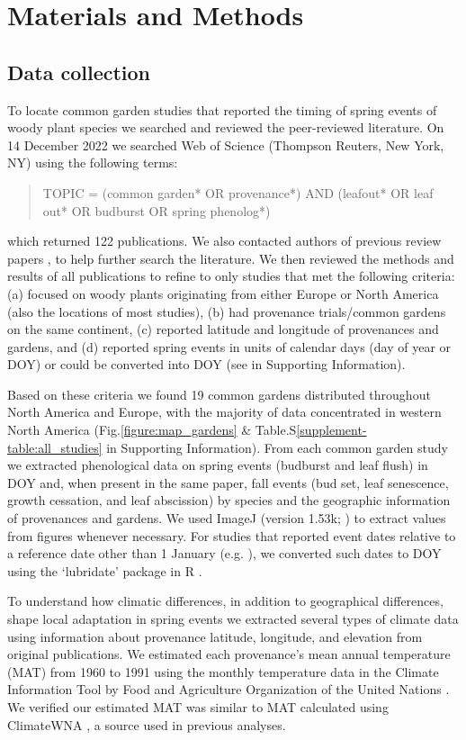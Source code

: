 \documentclass[12pt]{article}
\begin{document}
\section{Materials and Methods}
\subsection{Data collection}
To locate common garden studies that reported the timing of spring events of woody plant species we searched and reviewed the peer-reviewed literature. On 14 December 2022 we searched Web of Science (Thompson Reuters, New York, NY) using the following terms:
\begin{quote}
TOPIC = (common garden* OR provenance*) AND (leafout* OR leaf out* OR budburst OR spring phenolog*)
\end{quote}
which returned 122 publications. We also contacted authors of previous review papers \citep{AitkenBemmels16, Alberto13}, to help further search the literature. We then reviewed the methods and results of all publications to refine to only studies that met the following criteria: (a) focused on woody plants originating from either Europe or North America (also the locations of most studies), (b) had provenance trials/common gardens on the same continent, (c) reported latitude and longitude of provenances and gardens, and (d) reported spring events in units of calendar days (day of year or DOY) or could be converted into DOY (see  in Supporting Information).

Based on these criteria we found 19 common gardens distributed throughout North America and Europe, with the majority of data concentrated in western North America (Fig.\ref{figure:map_gardens} \& Table.S\ref{supplement-table:all_studies} in Supporting Information). From each common garden study we extracted phenological data on spring events (budburst and leaf flush) in DOY and, when present in the same paper, fall events (bud set, leaf senescence, growth cessation, and leaf abscission) by species and the geographic information of provenances and gardens. We used ImageJ (version 1.53k; \citealp{schneider_rasband_eliceiri_2012}) to extract values from figures whenever necessary. For studies that reported event dates relative to a reference date other than 1 January (e.g. \citealp{Rehfeldt1994}), we converted such dates to DOY using the `lubridate' package in R \citep{Grolemund11}. 

To understand how climatic differences, in addition to geographical differences, shape local adaptation in spring events we extracted several types of climate data using information about provenance latitude, longitude, and elevation from original publications. We estimated each provenance's mean annual temperature (MAT) from 1960 to 1991 using the monthly temperature data in the Climate Information Tool by Food and Agriculture Organization of the United Nations \citep{FAO2022}. We verified our estimated MAT was similar to MAT calculated using ClimateWNA \citep{wang2016}, a source used in previous analyses. 
\end{document}
